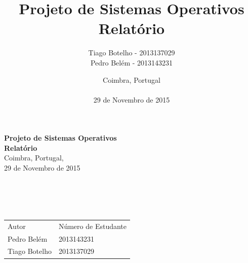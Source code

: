 \documentclass{article}
\begin{document}
\pagestyle{empty}
\title{Projeto de Sistemas Operativos \\ Relatório}
\author{Tiago Botelho - 2013137029 \\ Pedro Belém - 2013143231}
\date{Coimbra, Portugal \\~\\ 29 de Novembro de 2015}

\begin{titlepage}
  \begin{center}
    {\Large\bfseries Projeto de Sistemas Operativos \\ Relatório}\\

    \vspace{2\baselineskip}
    Coimbra, Portugal, \\
    29 de Novembro de 2015 \\~\\~\\~\\

     ~\\

  \begin{center}
    \begin{tabular}{ l l }
      Autor & Número de Estudante \\
      Pedro Belém & 2013143231 \\
      Tiago Botelho & 2013137029 \\
    \end{tabular}
  \end{center}
  \end{center}
\end{titlepage}
\end{document}
